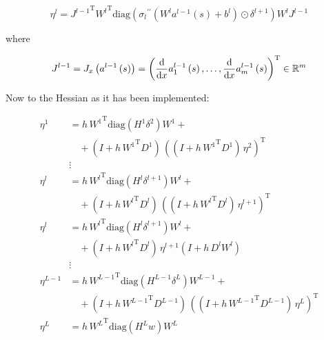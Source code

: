\begin{equation*}
    \eta^{l} = {J^{l-1}}^{\mathrm{T}} {W^{l}}^{\mathrm{T}} \mathrm{diag}\left({\sigma_{l}}^{\prime \prime}\left(W^{l} a^{l-1}\left(s\right) + b^{l}\right) \odot \delta^{l+1}\right) W^{l} J^{l-1}
\end{equation*}

where 

\begin{equation*}
    J^{l-1} = J_x\left(a^{l-1}\left(s\right)\right) = \left( \frac{\textup{d}}{\textup{d} x} a^{l-1}_1\left(s\right), \ldots, \frac{\textup{d}}{\textup{d} x} a^{l-1}_m\left(s\right) \right)^{\mathrm{T}} \in \mathbb{R}^{m}
\end{equation*}


Now to the Hessian as it has been implemented: 

\begin{align*}
    \eta^{1} & = h \, {W^{1}}^{\mathrm{T}} \mathrm{diag} \left( H^{1} \delta^{2} \right) W^{1} + \\
    & \quad + \left( I + h \, {W^{1}}^{\mathrm{T}} D^{1} \right) \, \left( \left( I + h \, {W^{1}}^{\mathrm{T}} D^{1} \right) \, \eta^{2} \right)^{\mathrm{T}} \\ 
    &\vdots\\
    \eta^{l} & = h \, {W^{l}}^{\mathrm{T}} \mathrm{diag} \left( H^{l} \delta^{l+1} \right) W^{l} + \\
    & \quad + \left( I + h \, {W^{l}}^{\mathrm{T}} D^{l} \right) \, \left( \left( I + h \, {W^{l}}^{\mathrm{T}} D^{l} \right) \, \eta^{l+1} \right)^{\mathrm{T}} \\ 
    \eta^{l} & = h \, {W^{l}}^{\mathrm{T}} \mathrm{diag} \left( H^{l} \delta^{l+1} \right) W^{l} + \\
    & \quad + \left( I + h \, {W^{l}}^{\mathrm{T}} D^{l} \right) \, \eta^{l+1}  \left( I + h \,  D^{l} {W^{l}} \right) \\ 
    &\vdots\\
    \eta^{L-1} & = h \, {W^{L-1}}^{\mathrm{T}} \mathrm{diag} \left( H^{L-1} \delta^{L} \right) W^{L-1} + \\
    & \quad + \left( I + h \, {W^{L-1}}^{\mathrm{T}} D^{L-1} \right) \, \left( \left( I + h \, {W^{L-1}}^{\mathrm{T}} D^{L-1} \right) \, \eta^{L} \right)^{\mathrm{T}} \\
    \eta^{L} &  = h \, {W^{L}}^{\mathrm{T}} \mathrm{diag}\left(H^{L} w\right) W^{L} 
\end{align*}

